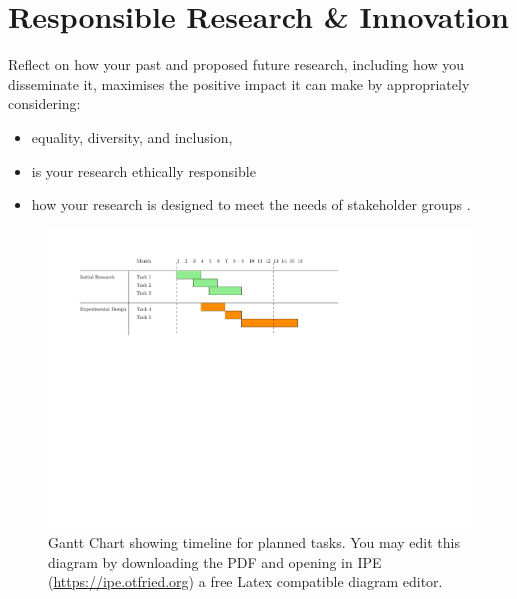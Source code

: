 \documentclass[11pt,a4paper]{article}
\begin{document}
\section{Responsible Research \& Innovation}
Reflect on how your past and proposed future research, including how you disseminate it, maximises the positive impact it can make by appropriately considering:
\begin{itemize}
    \item equality, diversity, and inclusion, 
    \item is your research ethically responsible 
    \item how your research is designed to meet the needs of stakeholder groups . 
\end{itemize}




\begin{landscape}
\begin{figure}
\includegraphics[width=0.7\linewidth]{images/ExampleGannt.pdf}
\caption{Gantt Chart showing timeline for planned tasks. You may edit this diagram by downloading the PDF and opening in IPE (\url{https://ipe.otfried.org}) a free Latex compatible diagram editor.\label{fig:Gantt}}
\end{figure}
\end{landscape}


\clearpage


\end{document}
